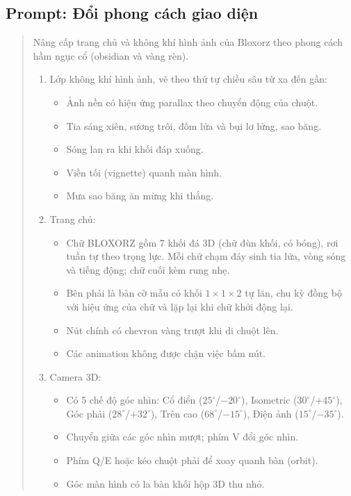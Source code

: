 \subsection*{Prompt: Đổi phong cách giao diện}
\label{sec:prompt-u4}

\begin{quote}
\small
\setlength{\emergencystretch}{2em}
Nâng cấp trang chủ và không khí hình ảnh của Bloxorz theo phong cách hầm ngục cổ (obsidian và vàng rèn).

\begin{enumerate}
  \item Lớp không khí hình ảnh, vẽ theo thứ tự chiều sâu từ xa đến gần:
  \begin{itemize}
    \item Ảnh nền có hiệu ứng parallax theo chuyển động của chuột.
    \item Tia sáng xiên, sương trôi, đốm lửa và bụi lơ lửng, sao băng.
    \item Sóng lan ra khi khối đáp xuống.
    \item Viền tối (vignette) quanh màn hình.
    \item Mưa sao băng ăn mừng khi thắng.
  \end{itemize}

  \item Trang chủ:
  \begin{itemize}
    \item Chữ BLOXORZ gồm 7 khối đá 3D (chữ đùn khối, có bóng), rơi tuần tự theo trọng lực. Mỗi chữ chạm đáy sinh tia lửa, vòng sóng và tiếng động; chữ cuối kèm rung nhẹ.
    \item Bên phải là bàn cờ mẫu có khối $1\times1\times2$ tự lăn, chu kỳ đồng bộ với hiệu ứng của chữ và lặp lại khi chữ khởi động lại.
    \item Nút chính có chevron vàng trượt khi di chuột lên.
    \item Các animation không được chặn việc bấm nút.
  \end{itemize}

  \item Camera 3D:
  \begin{itemize}
    \item Có 5 chế độ góc nhìn: Cổ điển ($25^\circ$/$-20^\circ$), Isometric ($30^\circ$/$+45^\circ$), Góc phải ($28^\circ$/$+32^\circ$), Trên cao ($68^\circ$/$-15^\circ$), Điện ảnh ($15^\circ$/$-35^\circ$).
    \item Chuyển giữa các góc nhìn mượt; phím V đổi góc nhìn.
    \item Phím Q/E hoặc kéo chuột phải để xoay quanh bàn (orbit).
    \item Góc màn hình có la bàn khối hộp 3D thu nhỏ.
  \end{itemize}


\end{enumerate}
\end{quote}
